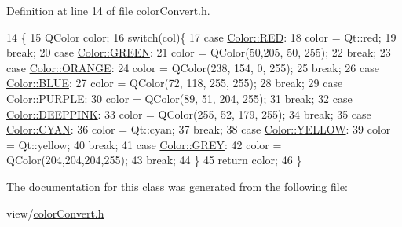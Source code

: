 Definition at line 14 of file color\+Convert.\+h.


\begin{DoxyCode}
14                                       \{
15         QColor color;
16         \textcolor{keywordflow}{switch}(col)\{
17         \textcolor{keywordflow}{case} \hyperlink{namespaceoli_aac44697e43b3ab2ad32fe892ab2276ebaa2d9547b5d3dd9f05984475f7c926da0}{Color::RED}:
18             color = Qt::red;
19             \textcolor{keywordflow}{break};
20         \textcolor{keywordflow}{case} \hyperlink{namespaceoli_aac44697e43b3ab2ad32fe892ab2276eba9de0e5dd94e861317e74964bed179fa0}{Color::GREEN}:
21             color = QColor(50,205, 50, 255);
22             \textcolor{keywordflow}{break};
23         \textcolor{keywordflow}{case} \hyperlink{namespaceoli_aac44697e43b3ab2ad32fe892ab2276eba5b6490317b6f7270bc3ab5ffd07c1f52}{Color::ORANGE}:
24             color = QColor(238, 154, 0, 255);
25             \textcolor{keywordflow}{break};
26         \textcolor{keywordflow}{case} \hyperlink{namespaceoli_aac44697e43b3ab2ad32fe892ab2276eba1b3e1ee9bff86431dea6b181365ba65f}{Color::BLUE}:
27             color = QColor(72, 118, 255, 255);
28             \textcolor{keywordflow}{break};
29         \textcolor{keywordflow}{case} \hyperlink{namespaceoli_aac44697e43b3ab2ad32fe892ab2276ebaec9c138095a352a9b7ef9ca5363b14d9}{Color::PURPLE}:
30             color =  QColor(89, 51, 204, 255);
31             \textcolor{keywordflow}{break};
32         \textcolor{keywordflow}{case} \hyperlink{namespaceoli_aac44697e43b3ab2ad32fe892ab2276eba90c86d1e3da733aaf155dcc24f2a235b}{Color::DEEPPINK}:
33             color = QColor(255, 52, 179, 255);
34             \textcolor{keywordflow}{break};
35         \textcolor{keywordflow}{case} \hyperlink{namespaceoli_aac44697e43b3ab2ad32fe892ab2276eba344dd8cd533280795b9db82ef0c92749}{Color::CYAN}:
36             color = Qt::cyan;
37             \textcolor{keywordflow}{break};
38         \textcolor{keywordflow}{case} \hyperlink{namespaceoli_aac44697e43b3ab2ad32fe892ab2276eba8a568e5f41b7e4da88fe5c4a00aad34e}{Color::YELLOW}:
39             color = Qt::yellow;
40             \textcolor{keywordflow}{break};
41         \textcolor{keywordflow}{case} \hyperlink{namespaceoli_aac44697e43b3ab2ad32fe892ab2276eba3c551f0d1a06b4f852d1832daed357bf}{Color::GREY}:
42             color = QColor(204,204,204,255);
43             \textcolor{keywordflow}{break};
44         \}
45         \textcolor{keywordflow}{return} color;
46     \}
\end{DoxyCode}


The documentation for this class was generated from the following file\+:\begin{DoxyCompactItemize}
\item 
view/\hyperlink{color_convert_8h}{color\+Convert.\+h}\end{DoxyCompactItemize}
